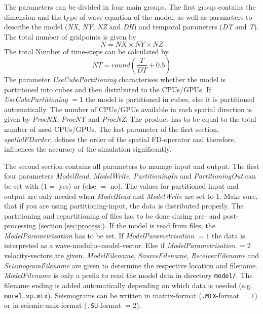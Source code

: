 \documentclass[pdftex,a4paper,parskip,listof=totoc,bibliography=totoc,onehalfspacing,12pt]{scrreprt}
\newcommand{\shellcmd}[1]{\indent\indent\texttt{#1}}	%
\begin{document}
The parameters can be divided in four main groups. The first group contains the dimension and the type of wave equation of the model, as well as parameters to describe the model (\textit{NX}, \textit{NY}, \textit{NZ} and \textit{DH}) and temporal parameters (\textit{DT} and \textit{T}). The total number of gridpoints is given by 
\begin{equation*}
	N=NX\times NY\times NZ
\end{equation*}
The total Number of time-steps can be calculated by 
\begin{equation*}
	NT = round\left(\frac{T}{DT}+0.5\right)
\end{equation*}
The parameter \textit{UseCubePartitioning} characterises whether the model is partitioned into cubes and then distributed to the CPUs/GPUs. If \textit{UseCubePartitioning} $=1$ the model is partitioned in cubes, else it is partitioned automatically. The number of CPUs/GPUs available in each spatial direction is given by \textit{ProcNX}, \textit{ProcNY} and \textit{ProcNZ}. The product has to be equal to the total number of used CPUs/GPUs. 
The last parameter of the first section, \textit{spatialFDorder}, defines the order of the spatial FD-operator and therefore, influences the accuracy of the simulation significantly.

The second section contains all parameters to manage input and output. The first four parameters \textit{ModelRead}, \textit{ModelWrite}, \textit{PartitioningIn} and  \textit{PartitioningOut} can be set with ($1=$ yes) or (else $=$ no). The values for partitioned input and output are only needed when \textit{ModelRead} and \textit{ModelWrite} are set to 1. Make sure, that if you are using partitioning-input, the data is distributed properly. The partitioning and repartitioning of files has to be done during pre- and post-processing (section \ref{sec:process}).
If the model is read from files, the \textit{ModelParametrisation} has to be set. If \textit{ModelParametrisation} $=1$ the data is interpreted as a wave-modulus-model-vector. Else if \textit{ModelParametrisation} $=2$ velocity-vectors are given.
\textit{ModelFilename}, \textit{SourceFilename}, \textit{ReceiverFilename} and  \textit{SeismogramFilename} are given to determine the respective location and filename. \textit{ModelFilename} is only a prefix to read the model data in directory \shellcmd{model/}. The filename ending is added automatically depending on which data is needed (e.g. \shellcmd{morel.vp.mtx}).
Seismograms can be written in matrix-format (\shellcmd{.MTX}-format $=1$) or in seismic-unix-format (\shellcmd{.SU}-format $=2$). 
\end{document}
